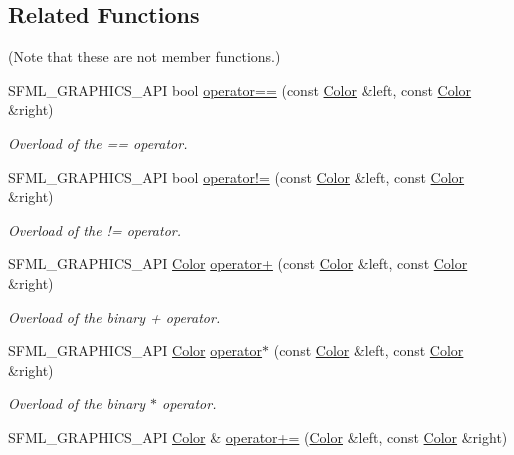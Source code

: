 \subsection*{Related Functions}
(Note that these are not member functions.) \begin{DoxyCompactItemize}
\item 
S\-F\-M\-L\-\_\-\-G\-R\-A\-P\-H\-I\-C\-S\-\_\-\-A\-P\-I bool \hyperlink{classsf_1_1Color_a7498d4670c7655e8d4d91ef49cc6064e}{operator==} (const \hyperlink{classsf_1_1Color}{Color} \&left, const \hyperlink{classsf_1_1Color}{Color} \&right)
\begin{DoxyCompactList}\small\item\em Overload of the == operator. \end{DoxyCompactList}\item 
S\-F\-M\-L\-\_\-\-G\-R\-A\-P\-H\-I\-C\-S\-\_\-\-A\-P\-I bool \hyperlink{classsf_1_1Color_a5d6501b7dd05f481b79f7163899f1d92}{operator!=} (const \hyperlink{classsf_1_1Color}{Color} \&left, const \hyperlink{classsf_1_1Color}{Color} \&right)
\begin{DoxyCompactList}\small\item\em Overload of the != operator. \end{DoxyCompactList}\item 
S\-F\-M\-L\-\_\-\-G\-R\-A\-P\-H\-I\-C\-S\-\_\-\-A\-P\-I \hyperlink{classsf_1_1Color}{Color} \hyperlink{classsf_1_1Color_a90e79ecc276114cda519a88119ac645b}{operator+} (const \hyperlink{classsf_1_1Color}{Color} \&left, const \hyperlink{classsf_1_1Color}{Color} \&right)
\begin{DoxyCompactList}\small\item\em Overload of the binary + operator. \end{DoxyCompactList}\item 
S\-F\-M\-L\-\_\-\-G\-R\-A\-P\-H\-I\-C\-S\-\_\-\-A\-P\-I \hyperlink{classsf_1_1Color}{Color} \hyperlink{classsf_1_1Color_aa9de267d831b4ec8ba65b627e51d50c3}{operator$\ast$} (const \hyperlink{classsf_1_1Color}{Color} \&left, const \hyperlink{classsf_1_1Color}{Color} \&right)
\begin{DoxyCompactList}\small\item\em Overload of the binary $\ast$ operator. \end{DoxyCompactList}\item 
S\-F\-M\-L\-\_\-\-G\-R\-A\-P\-H\-I\-C\-S\-\_\-\-A\-P\-I \hyperlink{classsf_1_1Color}{Color} \& \hyperlink{classsf_1_1Color_a19917f2453a4acfd69de2539bfab8031}{operator+=} (\hyperlink{classsf_1_1Color}{Color} \&left, const \hyperlink{classsf_1_1Color}{Color} \&right)

\end{DoxyCompactItemize}
